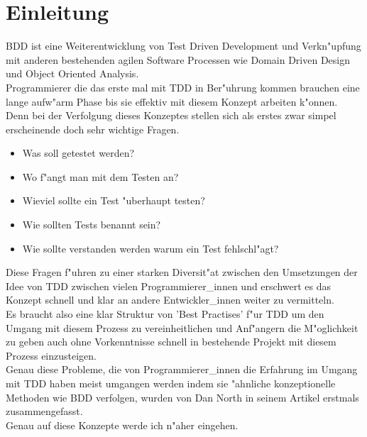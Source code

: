 \section{Einleitung}
  BDD ist eine Weiterentwicklung von Test Driven Development und Verkn"upfung 
  mit anderen bestehenden agilen Software Processen wie Domain Driven Design 
  und Object Oriented Analysis.\\
  Programmierer die das erste mal mit TDD in Ber"uhrung kommen brauchen eine 
  lange aufw"arm Phase bis sie effektiv mit diesem Konzept arbeiten k"onnen. 
  Denn bei der Verfolgung dieses Konzeptes stellen sich als erstes zwar simpel 
  erscheinende doch sehr wichtige Fragen.\\
  \begin{itemize}
    \item Was soll getestet werden?
    \item Wo f"angt man mit dem Testen an?
    \item Wieviel sollte ein Test "uberhaupt testen?
    \item Wie sollten Tests benannt sein?
    \item Wie sollte verstanden werden warum ein Test fehlschl"agt?
  \end{itemize}
  Diese Fragen f"uhren zu einer starken Diversit"at zwischen den Umsetzungen
  der Idee von TDD zwischen vielen Programmierer\_innen und erschwert es das Konzept
  schnell und klar an andere Entwickler\_innen weiter zu vermitteln.\\
  Es braucht also eine klar Struktur von 'Best Practises' f"ur TDD um den 
  Umgang mit diesem Prozess zu vereinheitlichen und Anf"angern die M"oglichkeit
  zu geben auch ohne Vorkenntnisse schnell in bestehende Projekt mit diesem 
  Prozess einzusteigen.\\
  Genau diese Probleme, die von Programmierer\_innen die Erfahrung im Umgang mit TDD 
  haben meist umgangen werden indem sie "ahnliche konzeptionelle Methoden wie 
  BDD verfolgen, wurden von Dan North\cite{North:2006} in seinem 
  Artikel erstmals zusammengefasst.\\
  Genau auf diese Konzepte werde ich n"aher eingehen.